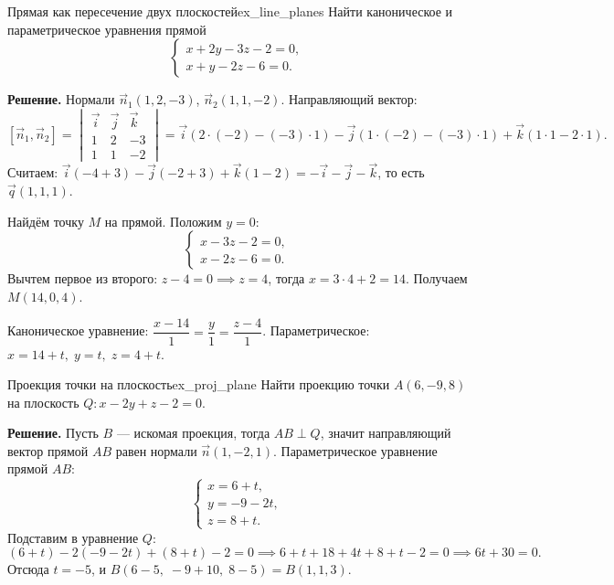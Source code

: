\documentclass[12pt,a4paper]{article}
\begin{document}
\begin{definition}{Прямая как пересечение двух плоскостей}{ex_line_planes}
  Найти каноническое и параметрическое уравнения прямой
  \[
    \begin{cases}
      x + 2y - 3z - 2 = 0, \\ x + y - 2z - 6 = 0.
    \end{cases}
  \]

  \textbf{Решение.} Нормали $\vec{n}_1(1,2,-3)$, $\vec{n}_2(1,1,-2)$.
  Направляющий вектор:
  \[
    [\vec{n}_1, \vec{n}_2] =
    \begin{vmatrix}
      \vec{i} & \vec{j} & \vec{k} \\ 1 & 2 & -3 \\ 1 & 1 & -2
    \end{vmatrix}
    = \vec{i}(2\cdot(-2) - (-3)\cdot 1) - \vec{j}(1\cdot(-2) - (-3)\cdot 1)
    + \vec{k}(1\cdot 1 - 2\cdot 1).
  \]
  Считаем: $\vec{i}(-4+3) - \vec{j}(-2+3) + \vec{k}(1-2)
  = -\vec{i} - \vec{j} - \vec{k}$, то есть $\vec{q}(1,1,1)$.

  Найдём точку $M$ на прямой. Положим $y = 0$:
  \[
    \begin{cases}
      x - 3z - 2 = 0, \\ x - 2z - 6 = 0.
    \end{cases}
  \]
  Вычтем первое из второго: $z - 4 = 0 \implies z = 4$, тогда
  $x = 3\cdot 4 + 2 = 14$. Получаем $M(14, 0, 4)$.

  Каноническое уравнение:
  $\dfrac{x-14}{1} = \dfrac{y}{1} = \dfrac{z-4}{1}$.
  Параметрическое: $x = 14 + t,\; y = t,\; z = 4 + t$.
\end{definition}

\begin{definition}{Проекция точки на плоскость}{ex_proj_plane}
  Найти проекцию точки $A(6,-9,8)$ на плоскость
  $Q\colon x - 2y + z - 2 = 0$.

  \textbf{Решение.} Пусть $B$ --- искомая проекция, тогда $AB \perp Q$,
  значит направляющий вектор прямой $AB$ равен нормали
  $\vec{n}(1,-2,1)$. Параметрическое уравнение прямой $AB$:
  \[
    \begin{cases}
      x = 6 + t, \\ y = -9 - 2t, \\ z = 8 + t.
    \end{cases}
  \]
  Подставим в уравнение $Q$:
  \[
    (6 + t) - 2(-9 - 2t) + (8 + t) - 2 = 0
    \implies 6 + t + 18 + 4t + 8 + t - 2 = 0
    \implies 6t + 30 = 0.
  \]
  Отсюда $t = -5$, и
  $B(6-5,\; -9+10,\; 8-5) = B(1, 1, 3)$.
\end{definition}
\end{document}
